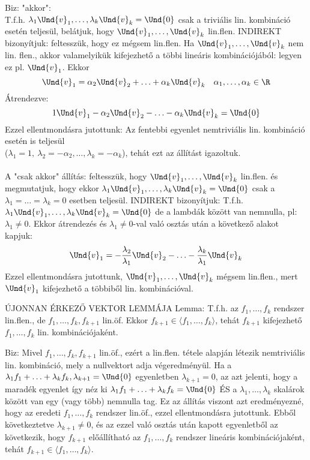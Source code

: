 \begin{leftbar}
Biz: "akkor":\\
T.f.h. $\lambda_1\Und{v}_1,\ldots,\lambda_k\Und{v}_k = \Und{0}$ csak a triviális lin. kombináció esetén teljesül, belátjuk, hogy $\Und{v}_1,\ldots,\Und{v}_k$ lin.flen. INDIREKT bizonyítjuk: feltesszük, hogy ez mégsem lin.flen. Ha $\Und{v}_1,\ldots,\Und{v}_k$ nem lin. flen., akkor valamelyikük kifejezhető a többi lineáris kombinációjából: legyen ez pl. $\Und{v}_1$. Ekkor $$\Und{v}_1 = \alpha_2\Und{v}_2 + \ldots + \alpha_k\Und{v}_k\quad \alpha_1,\ldots,\alpha_k \in \R$$
Átrendezve: $$1\Und{v}_1-\alpha_2\Und{v}_2 - \ldots - \alpha_k\Und{v}_k = \Und{0}$$
Ezzel ellentmondásra jutottunk: Az fentebbi egyenlet nemtriviális lin. kombináció esetén is teljesül \\($\lambda_1 = 1,\: \lambda_2 = -\alpha_2,\ldots, \lambda_k = -\alpha_k$), tehát ezt az állítást igazoltuk.\\\\
A "csak akkor" állítás: feltesszük, hogy  $\Und{v}_1,\ldots,\Und{v}_k$ lin.flen. és megmutatjuk, hogy ekkor  $\lambda_1\Und{v}_1,\ldots,\lambda_k\Und{v}_k = \Und{0}$ csak a $\lambda_1 = \ldots = \lambda_k = 0$ esetben teljesül. INDIREKT bizonyítjuk: T.f.h. $\lambda_1\Und{v}_1,\ldots,\lambda_k\Und{v}_k = \Und{0}$ de a lambdák között van nemnulla, pl: $\lambda_1 \neq 0$. Ekkor átrendezés és $\lambda_1 \neq 0$-val való osztás után a következő alakot kapjuk:
$$\Und{v}_1 = -\frac{\lambda_2}{\lambda_1}\Und{v}_2-\ldots-\frac{\lambda_k}{\lambda_1}\Und{v}_k$$
Ezzel ellentmondásra jutottunk, $\Und{v}_1,\ldots,\Und{v}_k$ mégsem lin.flen., mert $\Und{v}_1$ kifejezhető a többiből lin. kombinációval.
\end{leftbar}
\begin{framed}
ÚJONNAN ÉRKEZŐ VEKTOR LEMMÁJA Lemma: T.f.h. az $f_1,\ldots,f_k$ rendszer lin.flen., de $f_1,\ldots,f_k,f_{k+1}$ lin.öf. Ekkor $f_{k+1} \in \langle f_1,\ldots,f_k \rangle$, tehát $f_{k+1}$ kifejezhető $f_1,\ldots,f_k$ lin. kombinációjaként.
\end{framed}
\begin{leftbar}
Biz: Mivel $f_1,\ldots,f_k,f_{k+1}$ lin.öf., ezért a lin.flen. tétele alapján létezik nemtriviális lin. kombináció, mely a nullvektort adja végeredményül. Ha a
$\lambda_1f_1+\ldots+\lambda_kf_k,\lambda_{k+1} = \Und{0}$  egyenletben $\lambda_{k+1} = 0$, az azt jelenti, hogy a maradék egyenlet így néz ki $\lambda_1f_1+\ldots+\lambda_kf_k = \Und{0}$ ÉS a $\lambda_1,\ldots,\lambda_k$ skalárok között van egy (vagy több) nemnulla tag. Ez az állítás viszont azt eredményezné, hogy az eredeti $f_1,\ldots,f_k$ rendszer lin.öf., ezzel ellentmondásra jutottunk. Ebből következtetve $\lambda_{k+1} \neq 0$, és az ezzel való osztás után kapott egyenletből az következik, hogy $f_{k+1}$ előállítható az $f_1,\ldots,f_k$ rendszer lineáris kombinációjaként, tehát $f_{k+1} \in \langle f_1,\ldots,f_k \rangle$.
\end{leftbar}
